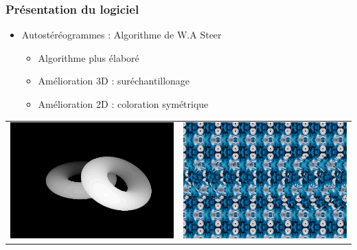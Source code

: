 \documentclass{beamer}
\begin{document}
\begin{frame}
\end{frame}

%
\begin{frame}
\frametitle{Présentation du logiciel}
\begin{itemize}[label=$\bullet$]
	\item Autostéréogrammes : Algorithme de W.A Steer \cite{wasteer}
	\begin{itemize}[label=$\circ$]
	\item Algorithme plus élaboré
	\item Amélioration 3D : suréchantillonage
	\item Amélioration 2D : coloration symétrique
	\end{itemize}
\end{itemize}
\begin{tabular}{l|r}
\includegraphics[scale=0.22]{donutdepth.png}
&
\includegraphics[scale=0.22]{donut2.png}
\end{tabular}

\end{frame}
\end{document}
